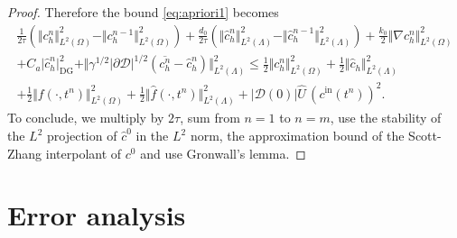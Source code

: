 \documentclass[pdflatex,sn-mathphys-num]{sn-jnl}%
\newcommand{\DG}{\mathrm{DG}}
\theoremstyle{thmstyleone}%
\theoremstyle{thmstyletwo}%
\theoremstyle{thmstylethree}%
\begin{document}
\begin{proof}
Therefore the bound \eqref{eq:apriori1} becomes
\begin{align}
\frac{1}{2\tau}(\Vert c_h^n\Vert_{L^2(\Omega)}^2 - \Vert c_h^{n-1}\Vert_{L^2(\Omega)}^2) 
+\frac{d_0}{2\tau}(\Vert \hat c_h^n\Vert_{L^2(\Lambda)}^2 - \Vert \hat c_h^{n-1}\Vert_{L^2(\Lambda)}^2) 
+  \frac{k_0}{2} \Vert \nabla c_h^n \Vert_{L^2(\Omega)}^2
\nonumber\\
+ C_a \vert \hat c_h^n \vert_{\DG}^2 
+\Vert \gamma^{1/2} \vert \partial\mathcal{D}\vert^{1/2} \left(\overline{c_h^{n}}-\hat{c}_h^{n}\right)\Vert_{L^2(\Lambda)}^2
\leq  
\frac12 \Vert c_h^n\Vert_{L^2(\Omega)}^2
+ \frac12 \Vert \hat c_h \Vert_{L^2(\Lambda)}^2
\nonumber\\
+ \frac12 \Vert f(\cdot,t^n)\Vert_{L^2(\Omega)}^2
+ \frac12 \Vert \hat f(\cdot,t^n) \Vert_{L^2(\Lambda)}^2
+ |\mathcal{D}(0)|\hat U \, (c^{\mathrm{in}}(t^n))^2.
\label{eq:apriori2}
\end{align}
To conclude, we multiply by $2\tau$, sum from $n=1$ to $n=m$,  use the stability of the $L^2$ projection of $\hat c^0$ in the $L^2$ norm, the approximation bound of the Scott-Zhang interpolant of $c^0$ and use Gronwall's lemma. 
\end{proof}


\section{Error analysis}
\label{sec:error}
\end{document}
